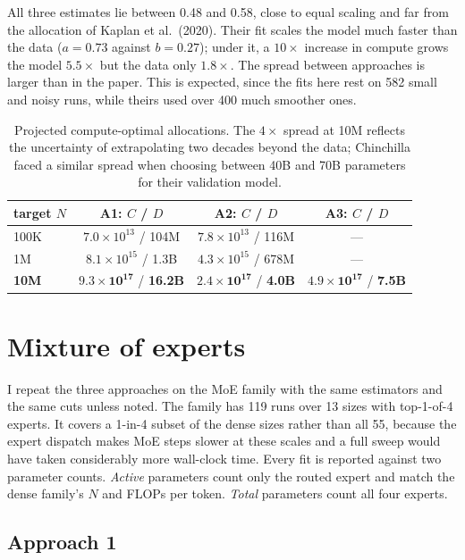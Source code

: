 \documentclass[10pt]{article}
\newcommand{\e}[1]{\times 10^{#1}}
\begin{document}
All three estimates lie between 0.48 and 0.58, close to equal scaling and
far from the allocation of Kaplan et al.\ (2020). Their fit scales the
model much faster than the data ($a = 0.73$ against $b = 0.27$); under it, a
$10\times$ increase in compute grows the model $5.5\times$ but the data only
$1.8\times$. The spread between approaches is larger than in the paper.
This is expected, since the fits here rest on 582 small and noisy runs,
while theirs used over 400 much smoother ones.

\begin{table}[H]
\centering
\small
\begin{tabular}{lccc}
\toprule
target $N$ & A1: $C$ / $D$ & A2: $C$ / $D$ & A3: $C$ / $D$ \\
\midrule
100K & $7.0\e{13}$ / 104M & $7.8\e{13}$ / 116M & --- \\
1M   & $8.1\e{15}$ / 1.3B & $4.3\e{15}$ / 678M & --- \\
\textbf{10M} & $\mathbf{9.3\e{17}}$ / \textbf{16.2B} & $\mathbf{2.4\e{17}}$ / \textbf{4.0B} & $\mathbf{4.9\e{17}}$ / \textbf{7.5B} \\
\bottomrule
\end{tabular}
\caption{Projected compute-optimal allocations. The $4\times$ spread at 10M
reflects the uncertainty of extrapolating two decades beyond the data;
Chinchilla faced a similar spread when choosing between 40B and 70B
parameters for their validation model.}
\label{tab:proj}
\end{table}

\section{Mixture of experts}

I repeat the three approaches on the MoE family with the same estimators
and the same cuts unless noted. The family has 119 runs over 13 sizes with
top-1-of-4 experts. It covers a 1-in-4 subset of the dense sizes rather
than all 55, because the expert dispatch makes MoE steps slower at these
scales and a full sweep would have taken considerably more
wall-clock time. Every fit is
reported against two parameter counts.
\emph{Active} parameters count only the routed expert and match the dense
family's $N$ and FLOPs per token. \emph{Total} parameters count all four
experts.

\subsection{Approach 1}
\end{document}
